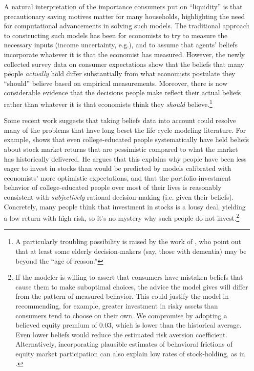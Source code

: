 \documentclass[12pt,letterpaper, fleqn]{article}
\begin{document}
A natural interpretation of the importance consumers put on ``liquidity'' is that precautionary saving motives matter for many households, highlighting the need for computational advancements in solving such models.
The traditional approach to constructing such models has been for economists to try to measure the necessary inputs (income uncertainty, e.g.), and to assume that agents' beliefs incorporate whatever it is that the economist has measured.
However, the newly collected survey data on consumer expectations show that the beliefs that many people \textit{actually} hold differ substantially from what economists postulate they ``should'' believe based on empirical measurements.
Moreover, there is now considerable evidence that the decisions people make reflect their actual beliefs rather than whatever it is that economists think they \textit{should} believe.\footnote{A particularly troubling possibility is raised by the work of \cite{gabaix2010age}, who point out that at least some elderly decision-makers (say, those with dementia) may be beyond the ``age of reason.''}

Some recent work suggests that taking beliefs data into account could resolve many of the problems that have long beset the life cycle modeling literature.
For example, \cite{velasquezgiraldoJMP} shows that even college-educated people systematically have held beliefs about stock market returns that are pessimistic compared to what the market has historically delivered.
He argues that this explains why people have been less eager to invest in stocks than would be predicted by models calibrated with economists' more optimistic expectations, and that the portfolio investment behavior of college-educated people over most of their lives is reasonably consistent with \textit{subjectively} rational decision-making (i.e. given their beliefs).
Concretely, many people think that investment in stocks is a lousy deal, yielding a low return with high risk, so it's no mystery why such people do not invest.\footnote{If the modeler is willing to assert that consumers have mistaken beliefs that cause them to make suboptimal choices, the advice the model gives will differ from the pattern of measured behavior. This could justify the model in recommending, for example, greater investment in risky assets than consumers tend to choose on their own. We compromise by adopting a believed equity premium of 0.03, which is lower than the historical average. Even lower beliefs would reduce the estimated risk aversion coefficient. Alternatively, incorporating plausible estimates of behavioral frictions of equity market participation can also explain low rates of stock-holding, as in \cite{Choukhmane2024}.}
\end{document}
